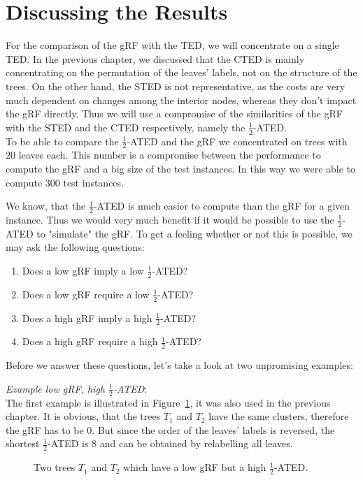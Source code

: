 \section{Discussing the Results}
For the comparison of the gRF with the TED, we will concentrate on a single TED. In the previous chapter, we discussed that the CTED is mainly concentrating on the permutation of the leaves' labels, not on the structure of the trees. On the other hand, the STED is not representative, as the costs are very much dependent on changes among the interior nodes, whereas they don't impact the gRF directly. Thus we will use a compromise of the similarities of the gRF with the STED and the CTED respectively, namely the $\frac{1}{2}$-ATED. \\
To be able to compare the $\frac{1}{2}$-ATED and the gRF we concentrated on trees with $20$ leaves each. This number is a compromise between the performance to compute the gRF and a big size of the test instances. In this way we were able to compute $300$ test instances.

We know, that the $\frac{1}{2}$-ATED is much easier to compute than the gRF for a given instance. Thus we would very much benefit if it would be possible to use the $\frac{1}{2}$-ATED to "simulate" the gRF. To get a feeling whether or not this is possible, we may ask the following questions:
\begin{enumerate}
	\item Does a low gRF imply a low $\frac{1}{2}$-ATED?
	\item Does a low gRF require a low $\frac{1}{2}$-ATED?
	\item Does a high gRF imply a high $\frac{1}{2}$-ATED?
	\item Does a high gRF require a high $\frac{1}{2}$-ATED?
\end{enumerate}
Before we answer these questions, let's take a look at two unpromising examples:

\textit{Example low gRF, high $\frac{1}{2}$-ATED}:\\
The first example is illustrated in Figure~\ref{fig:lght}, it was also used in the previous chapter. It is obvious, that the trees $T_1$ and $T_2$ have the same clusters, therefore the gRF has to be $0$. But since the order of the leaves' labels is reversed, the shortest $\frac{1}{2}$-ATED is $8$ and can be obtained by relabelling all leaves. 
\begin{figure}[!ht]
	\centering
	\caption{Two trees $T_1$ and $T_2$ which have a low gRF but a high $\frac{1}{2}$-ATED.}
	\label{fig:lght}
\end{figure} 

